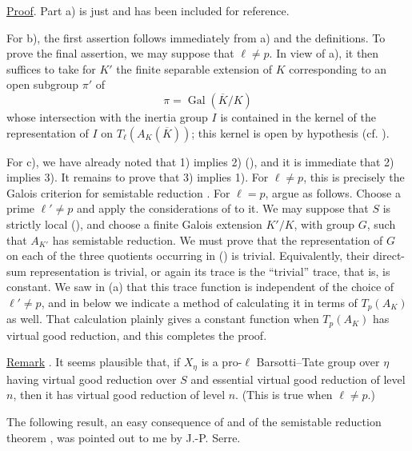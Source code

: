 \noindent
\underline{Proof}. Part a) is just  and has been included for
reference.

For b), the first assertion follows immediately from a) and the
definitions. To prove the final assertion, we may suppose that
$\ell\neq p$. In view of a), it then suffices to take for $K'$ the
finite separable extension of $K$ corresponding to an open subgroup
$\pi'$ of
\[
 \pi=\operatorname{Gal}(\overline K/K)
\]
whose intersection with the inertia group $I$ is contained in the
kernel of the representation of $I$ on
$T_\ell(A_K(\overline K))$; this kernel is open by hypothesis
(cf. ).

For c), we have already noted that 1) implies 2) (), and it is
immediate that 2) implies 3). It remains to prove that 3) implies 1).
For $\ell\neq p$, this is precisely the Galois criterion for
semistable reduction . For $\ell=p$, argue as follows. Choose a
prime $\ell'\neq p$ and apply the considerations of  to it. We may
suppose that $S$ is strictly local (), and choose a finite Galois
extension $K'/K$, with group $G$, such that $A_{K'}$ has semistable
reduction. We must prove that the representation of $G$ on each of the
three quotients occurring in () is trivial. Equivalently, their
direct-sum representation is trivial, or again its trace is the
``trivial'' trace, that is, is constant. We saw in (a) that this
trace function is independent of the choice of $\ell'\neq p$, and in
 below we indicate a method of calculating it in terms of
$T_p(A_K)$ as well. That calculation plainly gives a constant function
when $T_p(A_K)$ has virtual good reduction, and this completes the
proof.

\medskip
\noindent
\underline{Remark} . It seems plausible that, if $X_\eta$ is a
pro-$\ell$ Barsotti--Tate group over $\eta$ having virtual good
reduction over $S$ and essential virtual good reduction of level $n$,
then it has virtual good reduction of level $n$. (This is true when
$\ell\neq p$.)

The following result, an easy consequence of  and of the
semistable reduction theorem , was pointed out to me by
J.-P. Serre.

